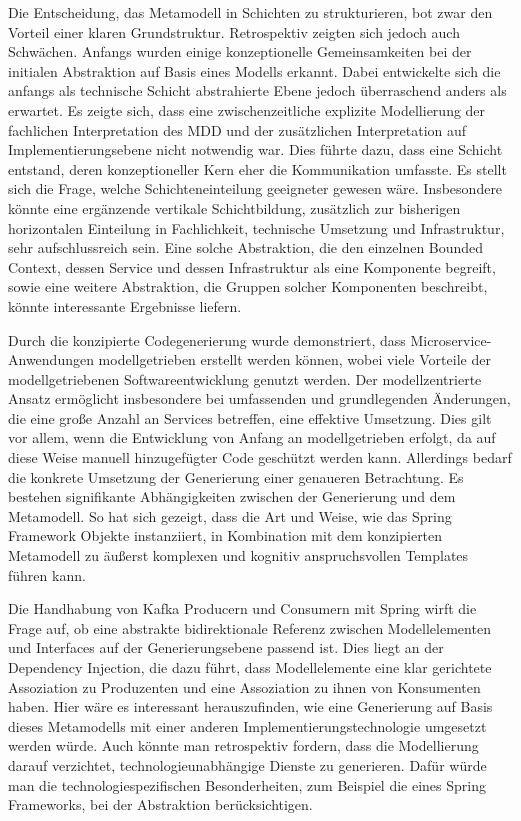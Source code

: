 Die Entscheidung, das Metamodell in Schichten zu strukturieren, bot zwar den Vorteil einer klaren Grundstruktur. Retrospektiv zeigten sich jedoch auch Schwächen. Anfangs wurden einige konzeptionelle Gemeinsamkeiten bei der initialen Abstraktion auf Basis eines Modells erkannt. Dabei entwickelte sich die anfangs als technische Schicht abstrahierte Ebene jedoch überraschend anders als erwartet. Es zeigte sich, dass eine zwischenzeitliche explizite Modellierung der fachlichen Interpretation des MDD und der zusätzlichen Interpretation auf Implementierungsebene nicht notwendig war. Dies führte dazu, dass eine Schicht entstand, deren konzeptioneller Kern eher die Kommunikation umfasste. Es stellt sich die Frage, welche Schichteneinteilung geeigneter gewesen wäre. Insbesondere könnte eine ergänzende vertikale Schichtbildung, zusätzlich zur bisherigen horizontalen Einteilung in Fachlichkeit, technische Umsetzung und Infrastruktur, sehr aufschlussreich sein. Eine solche Abstraktion, die den einzelnen Bounded Context, dessen Service und dessen Infrastruktur als eine Komponente begreift, sowie eine weitere Abstraktion, die Gruppen solcher Komponenten beschreibt, könnte interessante Ergebnisse liefern.

Durch die konzipierte Codegenerierung wurde demonstriert, dass Microservice-Anwendungen modellgetrieben erstellt werden können, wobei viele Vorteile der modellgetriebenen Softwareentwicklung genutzt werden. Der modellzentrierte Ansatz ermöglicht insbesondere bei umfassenden und grundlegenden Änderungen, die eine große Anzahl an Services betreffen, eine effektive Umsetzung. Dies gilt vor allem, wenn die Entwicklung von Anfang an modellgetrieben erfolgt, da auf diese Weise manuell hinzugefügter Code geschützt werden kann. Allerdings bedarf die konkrete Umsetzung der Generierung einer genaueren Betrachtung. Es bestehen signifikante Abhängigkeiten zwischen der Generierung und dem Metamodell. So hat sich gezeigt, dass die Art und Weise, wie das Spring Framework Objekte instanziiert, in Kombination mit dem konzipierten Metamodell zu äußerst komplexen und kognitiv anspruchsvollen Templates führen kann.

Die Handhabung von Kafka Producern und Consumern mit Spring wirft die Frage auf, ob eine abstrakte bidirektionale Referenz zwischen Modellelementen und Interfaces auf der Generierungsebene passend ist. Dies liegt an der Dependency Injection, die dazu führt, dass Modellelemente eine klar gerichtete Assoziation zu Produzenten und eine Assoziation zu ihnen von Konsumenten haben. Hier wäre es interessant herauszufinden, wie eine Generierung auf Basis dieses Metamodells mit einer anderen Implementierungstechnologie umgesetzt werden würde. Auch könnte man retrospektiv fordern, dass die Modellierung darauf verzichtet, technologieunabhängige Dienste zu generieren. Dafür würde man die technologiespezifischen Besonderheiten, zum Beispiel die eines Spring Frameworks, bei der Abstraktion berücksichtigen.

